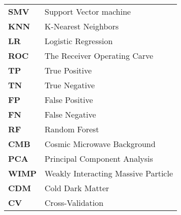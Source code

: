\documentclass[reqno,12pt,oneside]{report} %
\theoremstyle{plain}
\theoremstyle{definition}
\theoremstyle{remark}
\numberwithin{theorem}{chapter}     %
\begin{document}
\begin{tabular}{p{2.5cm}p{10cm}}

\textbf{SMV }  & Support Vector machine  \\
\textbf{KNN}  & K-Nearest Neighbors \\ 
\textbf{LR}  & Logistic Regression\\
\textbf{ROC}  & The Receiver Operating Carve\\
\textbf{TP}  & True Positive\\
\textbf{TN}  & True Negative\\
\textbf{FP}  & False Positive\\
\textbf{FN}  & False Negative\\
\textbf{RF} &  Random Forest\\
\textbf{CMB} & Cosmic Microwave Background\\
\textbf{PCA} & Principal Component Analysis\\
\textbf{WIMP} & Weakly Interacting Massive Particle\\
\textbf{CDM} & Cold Dark Matter\\
\textbf{CV} & Cross-Validation\\
\end{tabular}








%
\listoffigures   %
\listoftables        %
\tableofcontents     %
\end{document}
